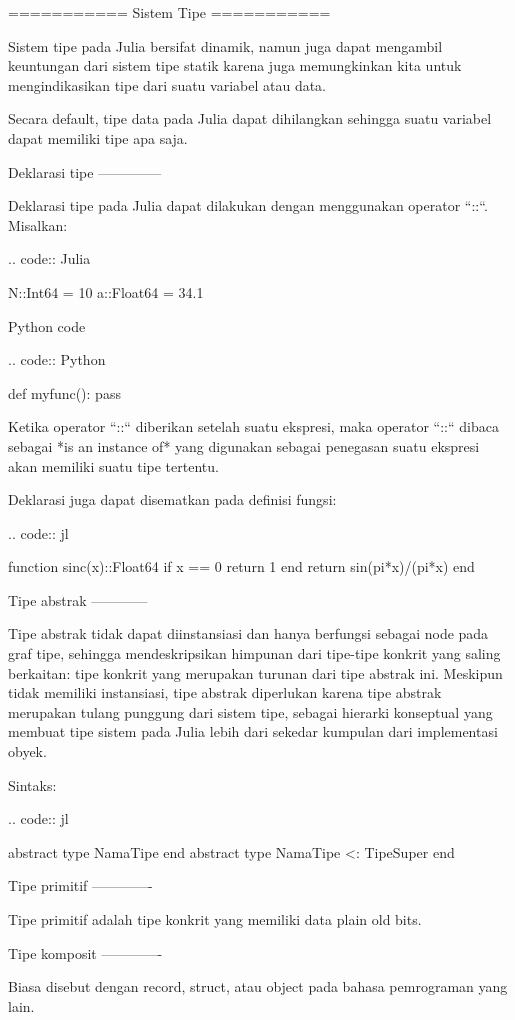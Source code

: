 ===========
Sistem Tipe
===========

Sistem tipe pada Julia bersifat dinamik, namun juga dapat mengambil keuntungan dari
sistem tipe statik karena juga memungkinkan kita untuk mengindikasikan tipe dari
suatu variabel atau data.

Secara default, tipe data pada Julia dapat dihilangkan sehingga suatu variabel
dapat memiliki tipe apa saja.


Deklarasi tipe
--------------

Deklarasi tipe pada Julia dapat dilakukan dengan menggunakan operator ``::``.
Misalkan:

.. code:: Julia

  N::Int64 = 10
  a::Float64 = 34.1


Python code

.. code:: Python

  def myfunc():
      pass

Ketika operator ``::`` diberikan setelah suatu ekspresi, maka operator ``::``
dibaca sebagai *is an instance of* yang digunakan sebagai penegasan suatu
ekspresi akan memiliki suatu tipe tertentu.

Deklarasi juga dapat disematkan pada definisi fungsi:

.. code:: jl

  function sinc(x)::Float64
    if x == 0
      return 1
    end
    return sin(pi*x)/(pi*x)
  end


Tipe abstrak
------------

Tipe abstrak tidak dapat diinstansiasi dan hanya berfungsi sebagai node pada
graf tipe, sehingga mendeskripsikan himpunan dari tipe-tipe konkrit yang saling
berkaitan: tipe konkrit yang merupakan turunan dari tipe abstrak ini.
Meskipun tidak memiliki instansiasi, tipe abstrak diperlukan karena tipe abstrak
merupakan tulang punggung dari sistem tipe, sebagai hierarki konseptual yang
membuat tipe sistem pada Julia lebih dari sekedar kumpulan dari implementasi obyek.

Sintaks:

.. code:: jl

  abstract type NamaTipe end
  abstract type NamaTipe <: TipeSuper end


Tipe primitif
-------------

Tipe primitif adalah tipe konkrit yang memiliki data plain old bits.


Tipe komposit
-------------

Biasa disebut dengan record, struct, atau object pada bahasa pemrograman yang
lain.

